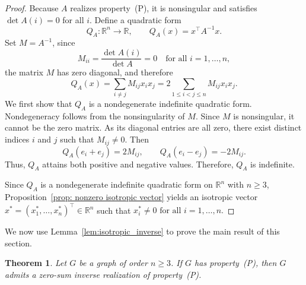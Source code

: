 \documentclass[12pt,reqno]{amsart}
\newtheorem{thm}{Theorem}[section]
\theoremstyle{definition}
\numberwithin{equation}{subsection}
\numberwithin{equation}{section}
\def\det{\operatorname{det}}
\begin{document}
\begin{proof}
 Because $A$ realizes property~(P), it is nonsingular and satisfies $\det A(i) = 0$ for all $i$. Define a quadratic form
\[
Q_A:\mathbb{R}^n\longrightarrow \mathbb{R},
\qquad
Q_A(x)=x^\top A^{-1}x.
\]
Set $M=A^{-1}$,
since
\[
M_{ii}=\frac{\det A(i)}{\det A}=0
\quad\text{for all } i=1,\dots,n,
\]
the matrix $M$ has zero diagonal, and therefore
\[
Q_A(x)=\sum_{i\neq j}M_{ij}x_ix_j
=
2\sum_{1\le i<j\le n}M_{ij}x_ix_j.
\]
We first show that $Q_A$ is a nondegenerate indefinite quadratic form. Nondegeneracy
follows from the nonsingularity of $M$. Since $M$ is nonsingular, it cannot be the zero matrix. As its diagonal entries are all zero, there exist distinct
indices $i$ and $j$ such that $M_{ij}\neq 0$. Then
\[
Q_A(e_i+e_j)=2M_{ij},
\qquad
Q_A(e_i-e_j)=-2M_{ij}.
\]
Thus, $Q_A$ attains both positive and negative values. Therefore, $Q_A$ is indefinite.

Since $Q_A$ is a nondegenerate indefinite quadratic form on $\mathbb{R}^n$ with
$n\ge3$, Proposition~\ref{prop: nonzero isotropic vector} yields an isotropic vector 
\(
x^\ast=(x_1^\ast,\dots,x_n^\ast)^\top\in\mathbb{R}^n
\)
such that
\(
x_i^\ast\neq 0
\text{ for all } i=1,\dots,n.
\)
\end{proof}

We now use Lemma~\ref{lem:isotropic_inverse} to prove the main result of this section.
\begin{thm}\label{general}
Let $G$ be a graph of order $n\ge 3$. If $G$ has property~(P), then $G$ admits a zero-sum inverse realization of property~(P).
\end{thm}
\end{document}
